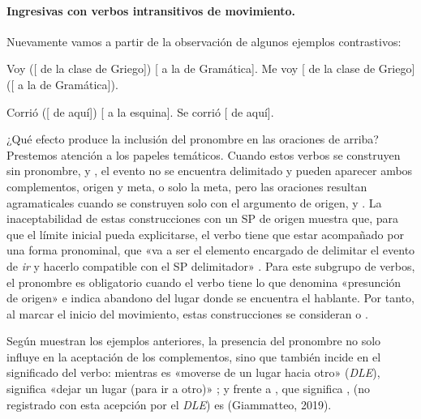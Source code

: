 \paragraph{Ingresivas con verbos intransitivos de movimiento.} Nuevamente vamos a
partir de la observación de algunos ejemplos contrastivos:

\begin{exe}
  \ex\label{ex:10-voy}
    \begin{xlist}
      \ex\label{ex:10-voy-a} Voy ([ de la clase de Griego])
          [ a la de Gramática].
      \ex Me voy [ de la clase de Griego] ([ a la de
          Gramática]).
    \end{xlist}
  \ex\label{ex:10-corrio}
    \begin{xlist}
      \ex\label{ex:10-corrio-a} Corrió ([ de aquí]) [ a la
          esquina].
      \ex Se corrió [ de aquí].
    \end{xlist}
\end{exe}

¿Qué efecto produce la inclusión del pronombre en las oraciones de arriba?
Prestemos atención a los papeles temáticos. Cuando estos verbos se construyen sin
pronombre,  y , el evento no se
encuentra delimitado y pueden aparecer ambos complementos, origen y meta, o solo
la meta, pero las oraciones resultan agramaticales cuando se construyen solo con
el argumento de origen,  y . La
inaceptabilidad de estas construcciones con un SP de origen muestra que, para
que el límite inicial pueda explicitarse, el verbo tiene que estar acompañado
por una forma pronominal, que «va a ser el elemento encargado de delimitar el
evento de \textit{ir} y hacerlo compatible con el SP delimitador»
\parencite[2986]{demiguel1999}. Para este subgrupo de verbos, el pronombre es
obligatorio cuando el verbo tiene lo que \textcite{demiguel1999} denomina
«presunción de origen» e indica abandono del lugar donde se encuentra el
hablante. Por tanto, al marcar el inicio del movimiento, estas construcciones se
consideran  o .

Según muestran los ejemplos anteriores, la presencia del pronombre no solo
influye en la aceptación de los complementos, sino que también incide en el
significado del verbo: mientras  es «moverse de un lugar hacia otro»
(\textit{DLE}),  significa «dejar un lugar (para ir a otro)»
\parencite[2986]{demiguel1999}; y frente a , que significa ,
 (no registrado con esta acepción por el \textit{DLE}) es
 (Giammatteo, 2019).

